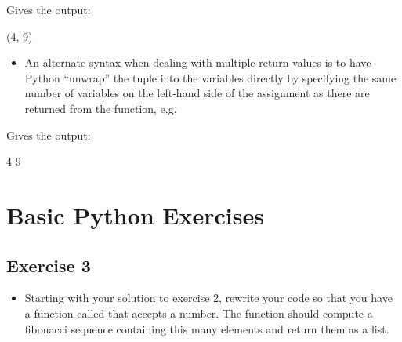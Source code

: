 \documentclass[letterpaper,10pt,english,openany]{sphinxmanual}
\begin{document}
Gives the output:

\begin{sphinxVerbatim}[commandchars=\\\{\}]
(4, 9)
\end{sphinxVerbatim}
\begin{itemize}
\item {} 
An alternate syntax when dealing with multiple return values is to
have Python “unwrap” the tuple into the variables directly by
specifying the same number of variables on the left-hand side of the
assignment as there are returned from the function, e.g.

\end{itemize}

\begin{sphinxVerbatim}[commandchars=\\\{\}]
 
      

   
  
  
\end{sphinxVerbatim}

Gives the output:

\begin{sphinxVerbatim}[commandchars=\\\{\}]
4
9
\end{sphinxVerbatim}



\section{Basic Python Exercises}
\label{\detokenize{introduction_to_python/basic_python_exercises_3-4:basic-python-exercises}}\label{\detokenize{introduction_to_python/basic_python_exercises_3-4:basic-python-exercises-3-4}}\label{\detokenize{introduction_to_python/basic_python_exercises_3-4::doc}}

\subsection{Exercise 3}
\label{\detokenize{introduction_to_python/basic_python_exercises_3-4:exercise-3}}\begin{itemize}
\item {} 
Starting with your solution to exercise 2, rewrite your code so that
you have a function called  that accepts a number. The
function should compute a fibonacci sequence containing this many
elements and return them as a list.

\end{itemize}
\end{document}
